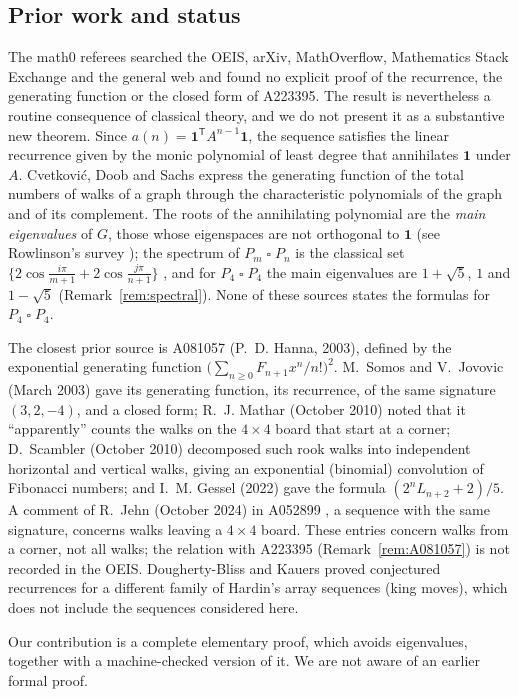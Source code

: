 \documentclass[11pt]{amsart}
\theoremstyle{plain}
\theoremstyle{definition}
\newcommand{\one}{\mathbf{1}}
\newcommand{\sq}{\mathbin{\square}}
\begin{document}
\subsection*{Prior work and status}
The math0 referees searched the OEIS, arXiv, MathOverflow, Mathematics Stack Exchange and the general web and found no explicit proof of the recurrence, the generating function or the closed form of A223395. The result is nevertheless a routine consequence of classical theory, and we do not present it as a substantive new theorem.
Since $a(n)=\one^{\mathsf T}A^{n-1}\one$, the sequence satisfies the linear recurrence given by the monic polynomial of least degree that annihilates $\one$ under $A$. Cvetkovi\'c, Doob and Sachs \cite[Theorem~1.11]{CDS} express the generating function of the total numbers of walks of a graph through the characteristic polynomials of the graph and of its complement. The roots of the annihilating polynomial are the \emph{main eigenvalues} of $G$, those whose eigenspaces are not orthogonal to $\one$ (see Rowlinson's survey \cite{Ro}); the spectrum of $P_m\sq P_n$ is the classical set $\{2\cos\frac{i\pi}{m+1}+2\cos\frac{j\pi}{n+1}\}$ \cite{CDS}, and for $P_4\sq P_4$ the main eigenvalues are $1+\sqrt5$, $1$ and $1-\sqrt5$ (Remark~\ref{rem:spectral}). None of these sources states the formulas for $P_4\sq P_4$.

The closest prior source is A081057 \cite{A081057} (P.~D. Hanna, 2003), defined by the exponential generating function $\bigl(\sum_{n\ge0}F_{n+1}x^n/n!\bigr)^2$. M.~Somos and V.~Jovovic (March 2003) gave its generating function, its recurrence, of the same signature $(3,2,-4)$, and a closed form; R.~J. Mathar (October 2010) noted that it ``apparently'' counts the walks on the $4\times4$ board that start at a corner; D.~Scambler (October 2010) decomposed such rook walks into independent horizontal and vertical walks, giving an exponential (binomial) convolution of Fibonacci numbers; and I.~M. Gessel (2022) gave the formula $(2^nL_{n+2}+2)/5$. A comment of R.~Jehn (October 2024) in A052899 \cite{A052899}, a sequence with the same signature, concerns walks leaving a $4\times4$ board. These entries concern walks from a corner, not all walks; the relation with A223395 (Remark~\ref{rem:A081057}) is not recorded in the OEIS. Dougherty-Bliss and Kauers \cite{DK} proved conjectured recurrences for a different family of Hardin's array sequences (king moves), which does not include the sequences considered here.

Our contribution is a complete elementary proof, which avoids eigenvalues, together with a machine-checked version of it. We are not aware of an earlier formal proof.
\end{document}
